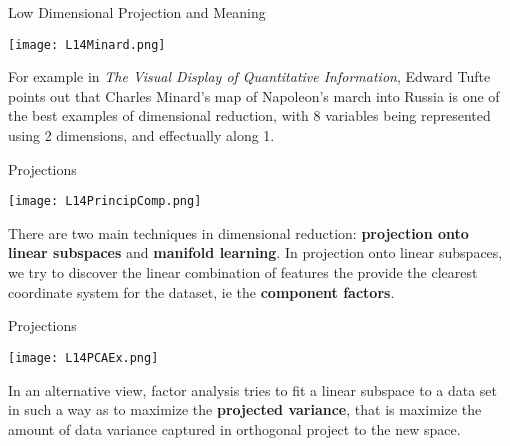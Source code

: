 \documentclass[10pt, table, dvipsnames,xcdraw,handout]{beamer}
\begin{document}
\begin{frame}[fragile]{Low Dimensional Projection and Meaning}
  \begin{minipage}[t][0.5\textheight][t]{\textwidth}
	\centering \texttt{[image: L14Minard.png]} 
  \end{minipage}
  \vfill
\begin{minipage}[t][0.5\textheight][t]{\textwidth}
For example in \emph{The Visual Display of Quantitative Information}, Edward Tufte points out that Charles Minard's map of Napoleon's march into Russia is one of the best examples of dimensional reduction, with 8 variables being represented using 2 dimensions, and effectually along 1. 
\end{minipage}
\end{frame}



\begin{frame}[fragile]{Projections}
  \begin{minipage}[t][0.5\textheight][t]{\textwidth}
	\centering \texttt{[image: L14PrincipComp.png]} 
  \end{minipage}
  \vfill
\begin{minipage}[t][0.5\textheight][t]{\textwidth}
There are two main techniques in dimensional reduction: \textbf{projection onto linear subspaces} and \textbf{manifold learning}. \pause In projection onto linear subspaces, we try to discover the linear combination of features the provide the clearest coordinate system for the dataset, ie the \textbf{component factors}.
\end{minipage}
\end{frame}


\begin{frame}[fragile]{Projections}
  \begin{minipage}[t][0.5\textheight][t]{\textwidth}
	\centering \texttt{[image: L14PCAEx.png]} 
  \end{minipage}
  \vfill
\begin{minipage}[t][0.5\textheight][t]{\textwidth}
In an alternative view, factor analysis tries to fit a linear subspace to a data set in such a way as to maximize the \textbf{projected variance}, that is maximize the amount of data variance captured in orthogonal project to the new space.  
\end{minipage}
\end{frame}
\end{document}
